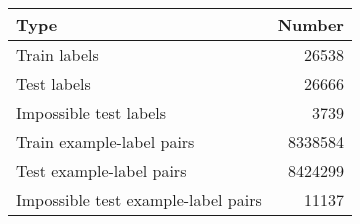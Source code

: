 \begin{tabular}{lr}
\toprule
                                Type &   Number \\
\midrule
                        Train labels &    26538 \\
                         Test labels &    26666 \\
              Impossible test labels &     3739 \\
           Train example-label pairs &  8338584 \\
            Test example-label pairs &  8424299 \\
 Impossible test example-label pairs &    11137 \\
\bottomrule
\end{tabular}
